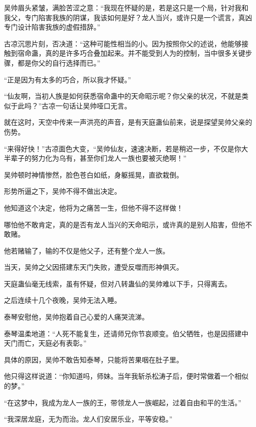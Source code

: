 
\begin{this_body}



吴帅眉头紧皱，满脸苦涩之意：“我现在怀疑的是，若是这只是一个局，针对我和我父，专门陷害我族的阴谋，我该如何是好？龙人当兴，或许只是一个谎言，真凶专门设计陷害我族的虚假措辞。”

古凉沉思片刻，否决道：“这种可能性相当的小。因为按照你父的述说，他能够接触到宿命蛊，真的是许多巧合叠加起来。并不能受到人为的控制，当中很多关键步骤，都是你父的自行选择而已。”

“正是因为有太多的巧合，所以我才怀疑。”

“仙友啊，当初人族是如何获悉宿命蛊中的天命昭示呢？你父亲的状况，不就是类似于此吗？”古凉一句话让吴帅哑口无言。

就在这时，天空中传来一声洪亮的声音，是有天庭蛊仙前来，说是探望吴帅父亲的伤势。

“来得好快！”古凉面色大变，“吴帅仙友，速速决断，若是稍迟一步，不仅是你大半辈子的努力化为乌有，甚至你们龙人一族也要被灭绝啊！”

吴帅顿时神情惨然，脸色苍白如纸，身躯摇晃，直欲栽倒。

形势所逼之下，吴帅不得不做出决定。

他知道这个决定，他将为之痛苦一生，但他不得不这样做！

哪怕他不敢肯定，真的是否有龙人当兴的天命昭示，或许真的是别人陷害，但他不敢赌。

他若赌输了，输的不仅是他父子，还有整个龙人一族。

当天，吴帅之父因搭建东天门失败，遭受反噬而形神俱灭。

天庭蛊仙毫无线索，虽有怀疑，但对八转蛊仙的吴帅难以下手，只得离去。

之后连续十几个夜晚，吴帅无法入睡。

泰琴安慰他，吴帅抱着自己心爱的人痛哭流涕。

泰琴温柔地道：“人死不能复生，还请师兄你节哀顺变。伯父牺牲，也是因搭建中天门而亡，天庭必有表彰。”

具体的原因，吴帅不敢告知泰琴，只能将苦果咽在肚子里。

他只得这样说道：“你知道吗，师妹。当年我斩杀松涛子后，便时常做着一个相似的梦。”

“在这梦中，我成为龙人一族的王，带领龙人一族崛起，过着自由和平的生活。”

“我深居龙庭，无为而治。龙人们安居乐业，平等安稳。”


\end{this_body}
